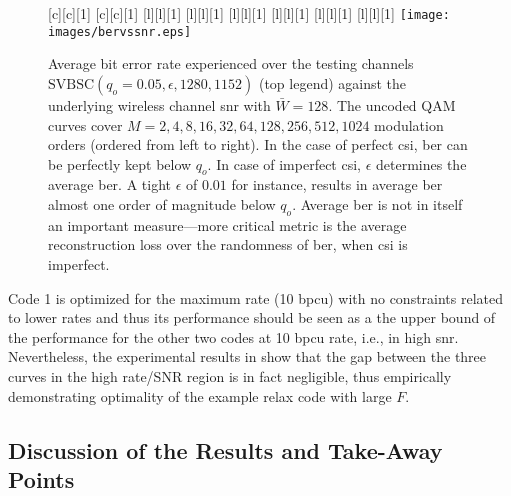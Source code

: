 \begin{figure}[t!]
\begin{center}
[c][c][1]{\scalebox{.8}{average bit error rate}}
[c][c][1]{\scalebox{.8}{channel signal to noise ratio [dB]}}
[l][l][1]{}
[l][l][1]{\scalebox{\textsizescale}{$q_o = 0.05$}}
[l][l][1]{}
[l][l][1]{\scalebox{\textsizescale}{imperfect CSI, $\epsilon = 0.01$}}
[l][l][1]{\scalebox{\textsizescale}{imperfect CSI, $\epsilon = 0.05$}}
[l][l][1]{\scalebox{\textsizescale}{imperfect CSI, $\epsilon = 0.1$}}
\texttt{[image: images/bervssnr.eps]}
\caption{Average bit error rate experienced over the  testing channels $\text{SVBSC}(q_o=0.05,\epsilon, 1280, 1152)$ (top legend) against the underlying wireless channel \gls{snr} with $\bar{W}=128$. The uncoded QAM curves cover $M = {2, 4, 8, 16, 32, 64, 128, 256, 512, 1024}$ modulation orders (ordered from left to right). In the case of perfect \gls{csi}, \gls{ber} can be perfectly kept below $q_o$. In case of imperfect \gls{csi}, $\epsilon$ determines the average \gls{ber}. A tight $\epsilon$ of $0.01$ for instance, results in average \gls{ber} almost one order of magnitude below $q_o$. Average \gls{ber} is not in itself  an important measure---more critical metric is the average reconstruction loss over the randomness of \gls{ber}, when \gls{csi} is imperfect.}
\label{fig:bervssnr}
\end{center}
\end{figure}

Code 1 is optimized for the maximum rate (10 bpcu) with no constraints related to lower rates and thus its performance should be seen as a the upper bound of the performance for the other two codes at 10 bpcu rate, i.e., in high \gls{snr}. Nevertheless, the experimental results in   show that the gap between the three curves in the high rate/SNR region is in fact negligible, thus empirically demonstrating  optimality of the example \gls{relax} code with large $F$. 





\subsection{Discussion of the Results and Take-Away Points}
\label{sec:discussionofresults}

